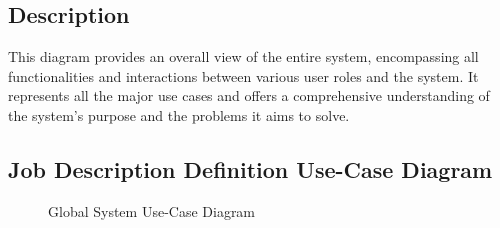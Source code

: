 \subsection*{Description}
This diagram provides an overall view of the entire system, encompassing all functionalities and interactions between various user roles and the system. It represents all the major use cases and offers a comprehensive understanding of the system's purpose and the problems it aims to solve.

\subsection{Job Description Definition Use-Case Diagram}
\begin{figure}[H]
    \centering
    \caption{ Global System Use-Case Diagram }
    \label{fig:Job_Description_Definition_UseCase_Diagram}
\end{figure}

